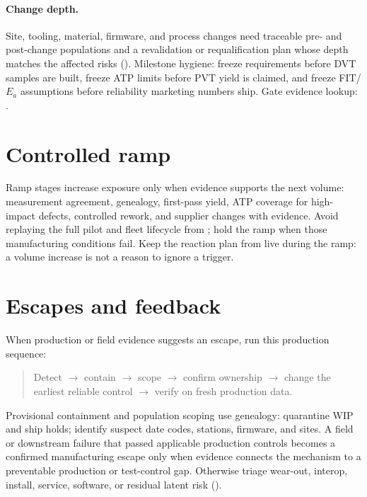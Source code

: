 \paragraph{Change depth.}
Site, tooling, material, firmware, and process changes need traceable pre- and
post-change populations and a revalidation or requalification plan whose depth
matches the affected risks (). Milestone hygiene: freeze
requirements before DVT samples are built, freeze ATP limits before PVT yield is
claimed, and freeze FIT/$E_a$ assumptions before reliability marketing numbers
ship. Gate evidence lookup: .

\section{Controlled ramp}
\label{sec:mfg-controlled-ramp}

Ramp stages increase exposure only when evidence supports the next volume:
measurement agreement, genealogy, first-pass yield, ATP coverage for
high-impact defects, controlled rework, and supplier changes with evidence.
Avoid replaying the full pilot and fleet lifecycle from
; hold the ramp when those manufacturing conditions
fail. Keep the reaction plan from  live during the ramp:
a volume increase is not a reason to ignore a trigger.

\section{Escapes and feedback}
\label{sec:escaped-defects}

When production or field evidence suggests an escape, run this production
sequence:

\begin{quote}
\noindent Detect
$\rightarrow$ contain
$\rightarrow$ scope
$\rightarrow$ confirm ownership
$\rightarrow$ change the earliest reliable control
$\rightarrow$ verify on fresh production data.
\end{quote}

Provisional containment and population scoping use genealogy: quarantine WIP and
ship holds; identify suspect date codes, stations, firmware, and sites. A field
or downstream failure that passed applicable production controls becomes a
confirmed manufacturing escape only when evidence connects the mechanism to a
preventable production or test-control gap. Otherwise triage wear-out, interop,
install, service, software, or residual latent risk
().

